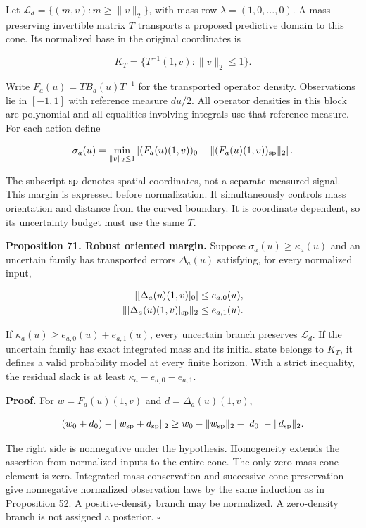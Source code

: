 Let \(\mathcal L_d=\{(m,v):m\geq\|v\|_2\}\), with mass row
\(\lambda=(1,0,\ldots,0)\). A mass preserving invertible matrix \(T\)
transports a proposed predictive domain to this cone. Its normalized
base in the original coordinates is

\[
K_T=\{T^{-1}(1,v):\|v\|_2\leq1\}.
\]

Write \(F_a(u)=TB_a(u)T^{-1}\) for the transported operator density.
Observations lie in \([-1,1]\) with reference measure \(du/2\). All
operator densities in this block are polynomial and all equalities
involving integrals use that reference measure. For each action define

\[
\sigma_a(u)=\min_{\|v\|_2\leq1}
\left[(F_a(u)(1,v))_0-\|(F_a(u)(1,v))_{\rm sp}\|_2\right].
\]

The subscript \(\rm sp\) denotes spatial coordinates, not a separate
measured signal. This margin is expressed before normalization. It
simultaneously controls mass orientation and distance from the curved
boundary. It is coordinate dependent, so its uncertainty budget must use
the same \(T\).

\textbf{Proposition 71. Robust oriented margin.} Suppose
\(\sigma_a(u)\geq\kappa_a(u)\) and an uncertain family has transported
errors \(\Delta_a(u)\) satisfying, for every normalized input,

\[
\begin{aligned}
|[\Delta_a(u)(1,v)]_0|&\leq e_{a,0}(u),\\
\|[\Delta_a(u)(1,v)]_{\rm sp}\|_2&\leq e_{a,1}(u).
\end{aligned}
\]

If \(\kappa_a(u)\geq e_{a,0}(u)+e_{a,1}(u)\), every uncertain branch
preserves \(\mathcal L_d\). If the uncertain family has exact integrated
mass and its initial state belongs to \(K_T\), it defines a valid
probability model at every finite horizon. With a strict inequality, the
residual slack is at least \(\kappa_a-e_{a,0}-e_{a,1}\).

\textbf{Proof.} For \(w=F_a(u)(1,v)\) and \(d=\Delta_a(u)(1,v)\),

\[
(w_0+d_0)-\|w_{\rm sp}+d_{\rm sp}\|_2
\geq w_0-\|w_{\rm sp}\|_2-|d_0|-\|d_{\rm sp}\|_2.
\]

The right side is nonnegative under the hypothesis. Homogeneity extends
the assertion from normalized inputs to the entire cone. The only
zero-mass cone element is zero. Integrated mass conservation and
successive cone preservation give nonnegative normalized observation
laws by the same induction as in Proposition 52. A positive-density
branch may be normalized. A zero-density branch is not assigned a
posterior. \(\square\)

